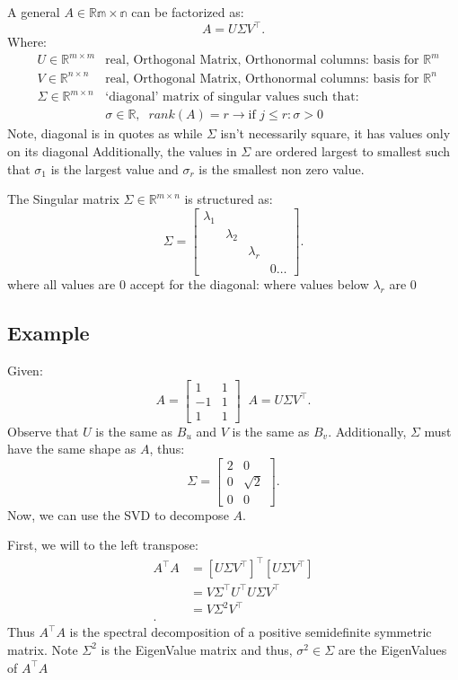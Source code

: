 \documentclass[12pt]{book}
\begin{document}
A general $A\in\mathbb{Rm\times n}$ can be factorized as:
\[
A = U\Sigma V^\top
.\] 
Where:
\begin{align*}
        &U \in \mathbb{R}^{m\times m} &\text{real, Orthogonal Matrix, Orthonormal columns: basis for $\mathbb{R}^m$}\\
        &V\in\mathbb{R}^{n\times n} &\text{real, Orthogonal Matrix, Orthonormal columns: basis for $\mathbb{R}^n$}\\
        &\Sigma \in \mathbb{R}^{m\times n} &\text{`diagonal' matrix of singular values such that:}\\
        & &\sigma\in\mathbb{R},\;\;rank(A) = r \to  \text{if } j\leq r: \sigma>0
\end{align*}
Note, diagonal is in quotes as while $\Sigma$ isn't necessarily square, it has values only on its diagonal
Additionally, the values in $\Sigma$ are ordered largest to smallest such that  $\sigma_1$ is the largest value and $\sigma_r$ is
 the smallest non zero value.

 The Singular matrix $\Sigma \in \mathbb{R}^{m\times n}$ is structured as:
\[
\Sigma =        \begin{bmatrix} \lambda_1  & & & \\ & \lambda_2 & & \\ & & \lambda_r & \\ & & & 0\ldots \end{bmatrix} 
.\] 
where all values are 0 accept for the diagonal: where values below $\lambda_r$ are 0

\subsection*{Example}
Given:
\[
        A = \begin{bmatrix} 1 & 1 \\ -1 & 1 \\ 1 & 1 \end{bmatrix}\;\;A = U\Sigma V^\top 
.\] 
Observe that $U$ is the same as  $B_u$ and  $V$ is the same as  $B_v$.
Additionally, $\Sigma$ must have the same shape as  $A$, thus:
 \[
         \Sigma = \begin{bmatrix} 2 & 0 \\ 0 & \sqrt{2} \\ 0 & 0  \end{bmatrix} 
.\] 
Now, we can use the SVD to decompose $A$.

First, we will to the left transpose:
\begin{align*}
        A^\top A &= [U\Sigma V^\top]^\top [U\Sigma V^\top]\\
        &= V\Sigma^\top U^\top U\Sigma V^\top \\
        &= V\Sigma^2V^\top \\
.\end{align*}
Thus $A^\top A$ is the spectral decomposition of a positive semidefinite
symmetric matrix. Note $\Sigma^2$ is the EigenValue matrix and thus, $\sigma^2\in\Sigma$ are
        the EigenValues of $A^\top A$
\end{document}
